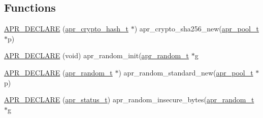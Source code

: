 \subsection*{Functions}
\begin{DoxyCompactItemize}
\item 
\mbox{\hyperlink{group__apr__random_ga198e0e695921706b8452432b40a48678}{A\+P\+R\+\_\+\+D\+E\+C\+L\+A\+RE}} (\mbox{\hyperlink{structapr__crypto__hash__t}{apr\+\_\+crypto\+\_\+hash\+\_\+t}} $\ast$) apr\+\_\+crypto\+\_\+sha256\+\_\+new(\mbox{\hyperlink{group__apr__pools_gaf137f28edcf9a086cd6bc36c20d7cdfb}{apr\+\_\+pool\+\_\+t}} $\ast$p)
\item 
\mbox{\hyperlink{group__apr__random_ga0beeda9af106148755f0dde71aea6c93}{A\+P\+R\+\_\+\+D\+E\+C\+L\+A\+RE}} (void) apr\+\_\+random\+\_\+init(\mbox{\hyperlink{group__apr__random_ga33073741e56b1bafe52ba58cefcbbf96}{apr\+\_\+random\+\_\+t}} $\ast$g
\item 
\mbox{\hyperlink{group__apr__random_ga7a5815c3aa0c70a34fe428af0dee40bb}{A\+P\+R\+\_\+\+D\+E\+C\+L\+A\+RE}} (\mbox{\hyperlink{group__apr__random_ga33073741e56b1bafe52ba58cefcbbf96}{apr\+\_\+random\+\_\+t}} $\ast$) apr\+\_\+random\+\_\+standard\+\_\+new(\mbox{\hyperlink{group__apr__pools_gaf137f28edcf9a086cd6bc36c20d7cdfb}{apr\+\_\+pool\+\_\+t}} $\ast$p)
\item 
\mbox{\hyperlink{group__apr__random_ga07682b862eda9e40f1d8c1377514b5ac}{A\+P\+R\+\_\+\+D\+E\+C\+L\+A\+RE}} (\mbox{\hyperlink{group__apr__errno_gaf76ee4543247e9fb3f3546203e590a6c}{apr\+\_\+status\+\_\+t}}) apr\+\_\+random\+\_\+insecure\+\_\+bytes(\mbox{\hyperlink{group__apr__random_ga33073741e56b1bafe52ba58cefcbbf96}{apr\+\_\+random\+\_\+t}} $\ast$g
\end{DoxyCompactItemize}
